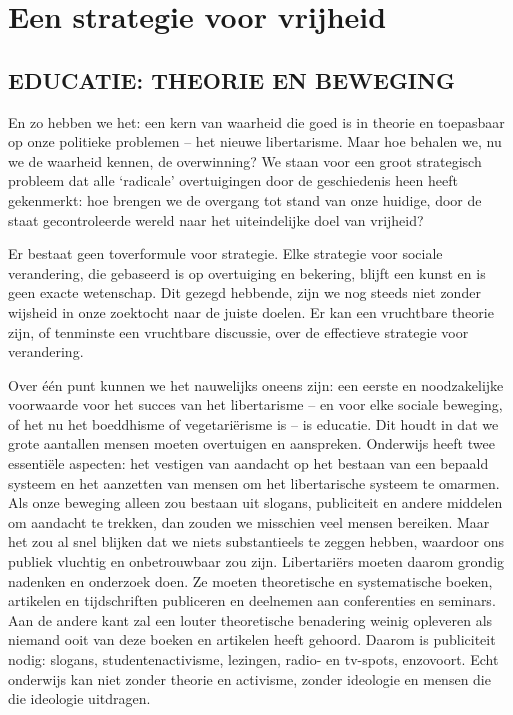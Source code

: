 \documentclass[
  a5paper,
  smalldemyvopaper,10pt,twoside,onecolumn,openright,extrafontsizes,hidelinks]{memoir}
\begin{document}

\chapter{Een strategie voor vrijheid}\label{een-strategie-voor-vrijheid}

\label{educatie-theorie-en-beweging}
\section{EDUCATIE: THEORIE EN
BEWEGING}\label{educatie-theorie-en-beweging}

En zo hebben we het: een kern van waarheid die goed is in theorie en
toepasbaar op onze politieke problemen -- het nieuwe libertarisme. Maar
hoe behalen we, nu we de waarheid kennen, de overwinning? We staan voor
een groot strategisch probleem dat alle `radicale' overtuigingen door de
geschiedenis heen heeft gekenmerkt: hoe brengen we de overgang tot stand
van onze huidige, door de staat gecontroleerde wereld naar het
uiteindelijke doel van vrijheid?

Er bestaat geen toverformule voor strategie. Elke strategie voor sociale
verandering, die gebaseerd is op overtuiging en bekering, blijft een
kunst en is geen exacte wetenschap. Dit gezegd hebbende, zijn we nog
steeds niet zonder wijsheid in onze zoektocht naar de juiste doelen. Er
kan een vruchtbare theorie zijn, of tenminste een vruchtbare discussie,
over de effectieve strategie voor verandering.

Over één punt kunnen we het nauwelijks oneens zijn: een eerste en
noodzakelijke voorwaarde voor het succes van het libertarisme -- en voor
elke sociale beweging, of het nu het boeddhisme of vegetariërisme is --
is educatie. Dit houdt in dat we grote aantallen mensen moeten
overtuigen en aanspreken. Onderwijs heeft twee essentiële aspecten: het
vestigen van aandacht op het bestaan van een bepaald systeem en het
aanzetten van mensen om het libertarische systeem te omarmen. Als onze
beweging alleen zou bestaan uit slogans, publiciteit en andere middelen
om aandacht te trekken, dan zouden we misschien veel mensen bereiken.
Maar het zou al snel blijken dat we niets substantieels te zeggen
hebben, waardoor ons publiek vluchtig en onbetrouwbaar zou zijn.
Libertariërs moeten daarom grondig nadenken en onderzoek doen. Ze moeten
theoretische en systematische boeken, artikelen en tijdschriften
publiceren en deelnemen aan conferenties en seminars. Aan de andere kant
zal een louter theoretische benadering weinig opleveren als niemand ooit
van deze boeken en artikelen heeft gehoord. Daarom is publiciteit nodig:
slogans, studentenactivisme, lezingen, radio- en tv-spots, enzovoort.
Echt onderwijs kan niet zonder theorie en activisme, zonder ideologie en
mensen die die ideologie uitdragen.
\end{document}
